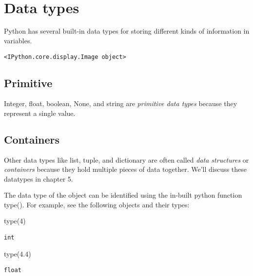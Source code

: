 \documentclass[
  letterpaper,
  DIV=11,
  numbers=noendperiod]{scrreprt}
\newenvironment{Shaded}{\begin{snugshade}}{\end{snugshade}}
\newcommand{\BuiltInTok}[1]{\textcolor[rgb]{0.00,0.23,0.31}{#1}}
\newcommand{\DecValTok}[1]{\textcolor[rgb]{0.68,0.00,0.00}{#1}}
\newcommand{\FloatTok}[1]{\textcolor[rgb]{0.68,0.00,0.00}{#1}}
\newcommand{\NormalTok}[1]{\textcolor[rgb]{0.00,0.23,0.31}{#1}}
\begin{document}
\hypertarget{data-types}{%
\section{Data types}\label{data-types}}

Python has several built-in data types for storing different kinds of
information in variables.

\begin{verbatim}
<IPython.core.display.Image object>
\end{verbatim}

\hypertarget{primitive}{%
\subsection{Primitive}\label{primitive}}

Integer, float, boolean, None, and string are \emph{primitive data
types} because they represent a single value.

\hypertarget{containers}{%
\subsection{Containers}\label{containers}}

Other data types like list, tuple, and dictionary are often called
\emph{data structures} or \emph{containers} because they hold multiple
pieces of data together. We'll discuss these datatypes in chapter 5.

The data type of the object can be identified using the in-built python
function type(). For example, see the following objects and their types:

\begin{Shaded}
\begin{Highlighting}[]
\BuiltInTok{type}\NormalTok{(}\DecValTok{4}\NormalTok{)}
\end{Highlighting}
\end{Shaded}

\begin{verbatim}
int
\end{verbatim}

\begin{Shaded}
\begin{Highlighting}[]
\BuiltInTok{type}\NormalTok{(}\FloatTok{4.4}\NormalTok{)}
\end{Highlighting}
\end{Shaded}

\begin{verbatim}
float
\end{verbatim}
\end{document}
